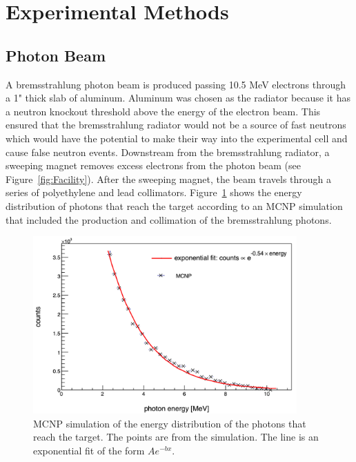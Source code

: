 \section{Experimental Methods}
\subsection{Photon Beam}
A bremsstrahlung photon beam is produced passing 10.5 MeV electrons through a 1" thick slab of aluminum.
Aluminum was chosen as the radiator because it has a neutron knockout threshold above the energy of the electron beam.
This ensured that the bremsstrahlung radiator would not be a source of fast neutrons which would have the potential to make their way into the experimental cell and cause false neutron events.
Downstream from the bremsstrahlung radiator, a sweeping magnet removes excess electrons from the photon beam (see Figure~\ref{fig:Facility}).
After the sweeping magnet, the beam travels through a series of polyethylene and lead collimators.
Figure~\ref{fig:BremDist} shows the energy distribution of photons that reach the target according to an MCNP simulation that included the production and collimation of the bremsstrahlung photons.

\begin{figure}[h]
\includegraphics[width=0.9\textwidth]{Content/Methods/MCNPBremDistribution.png}
\caption{MCNP simulation of the energy distribution of the photons that reach the target.
The points are from the simulation.
The line is an exponential fit of the form $Ae^{-bx}$.}
\label{fig:BremDist}
\end{figure}

